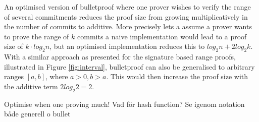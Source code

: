 An optimised version of bulletproof where one prover wishes to verify the range of several commitments reduces the proof size from growing multiplicatively in the number of commits to additive. More precisely lets a assume a prover wants to prove the range of $k$ commits a naive implementation would lead to a proof size of $k\cdot log_2 n $, but an optimised implementation reduces this to $log_2 n + 2 log_2 k$.  With a similar approach as presented for the signature based range proofs, illustrated in  Figure \ref{fig:interval},  bulletproof can also be generalised to arbitrary ranges $[a,b]$, where $a>0,b>a$.  This would then increase the proof size with the additive term $2log_2 2 = 2$. 


Optimise when one proving much!
Vad för hash function? 
Se igenom notation både generell  o bullet

